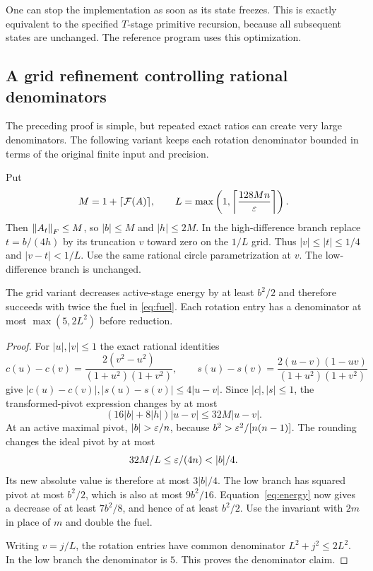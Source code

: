 One can stop the implementation as soon as its state freezes. This is exactly equivalent to the specified $T$-stage primitive recursion, because all subsequent states are unchanged. The reference program uses this optimization.

\subsection{A grid refinement controlling rational denominators}
\label{sec:grid}

The preceding proof is simple, but repeated exact ratios can create very large denominators. The following variant keeps each rotation denominator bounded in terms of the original finite input and precision.

Put
\[
 M=1+\lceil\mathcal F(A)\rceil,
 \qquad L=\max\left(1,\left\lceil\frac{128Mn}{\varepsilon}\right\rceil\right).
\]
Then $\left\lVert A_t\right\rVert_F\le M$, so $|b|\le M$ and $|h|\le2M$. In the high-difference branch replace $t=b/(4h)$ by its truncation $v$ toward zero on the $1/L$ grid. Thus $|v|\le|t|\le1/4$ and $|v-t|<1/L$. Use the same rational circle parametrization at $v$. The low-difference branch is unchanged.

\begin{proposition}
\label{prop:grid}
The grid variant decreases active-stage energy by at least $b^2/2$ and therefore succeeds with twice the fuel in \eqref{eq:fuel}. Each rotation entry has a denominator at most $\max(5,2L^2)$ before reduction.
\end{proposition}
\begin{proof}
For $|u|,|v|\le1$ the exact rational identities
\[
 c(u)-c(v)=\frac{2(v^2-u^2)}{(1+u^2)(1+v^2)},\qquad
 s(u)-s(v)=\frac{2(u-v)(1-uv)}{(1+u^2)(1+v^2)}
\]
give $|c(u)-c(v)|,|s(u)-s(v)|\le4|u-v|$. Since $|c|,|s|\le1$, the transformed-pivot expression changes by at most
\[
 (16|b|+8|h|)|u-v|\le32M|u-v|.
\]
At an active maximal pivot, $|b|>\eps/n$, because $b^2>\varepsilon^2/[n(n-1)]$. The rounding changes the ideal pivot by at most
\[
 32M/L\le\eps/(4n)<|b|/4.
\]
Its new absolute value is therefore at most $3|b|/4$. The low branch has squared pivot at most $b^2/2$, which is also at most $9b^2/16$. Equation~\eqref{eq:energy} now gives a decrease of at least $7b^2/8$, and hence of at least $b^2/2$. Use the invariant with $2m$ in place of $m$ and double the fuel.

Writing $v=j/L$, the rotation entries have common denominator $L^2+j^2\le2L^2$. In the low branch the denominator is $5$. This proves the denominator claim.
\end{proof}

